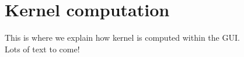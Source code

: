 
\chapter{Kernel computation}
\minitoc

This is where we explain how kernel is computed within the GUI. \\
Lots of text to come!